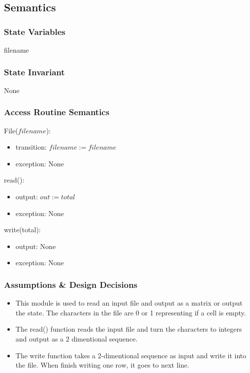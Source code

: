 \documentclass[12pt]{article}
\begin{document}
\subsection* {Semantics}

\subsubsection* {State Variables}

filename

\subsubsection* {State Invariant}

None
\subsubsection* {Access Routine Semantics}

File($filename$):
\begin{itemize}
\item transition: $filename := filename$
\item exception: None
\end{itemize}

\noindent read():
\begin{itemize}
\item output: $out := total$
\item exception: None
\end{itemize}

\noindent write(total):
\begin{itemize}
\item output: None
\item exception: None
\end{itemize}

\subsubsection* {Assumptions \& Design Decisions}
\begin{itemize}
\item
This module is used to read an input file and output as a matrix or output the state. The characters in the file are 0 or 1 representing if a cell is empty.
\item
The read() function reads the input file and turn the characters to integers and
output as a 2 dimentional sequence.
\item
The write function takes a 2-dimentional sequence as input and write it into the file.
When finish writing one row, it goes to next line.
\end{itemize}
\end{document}
